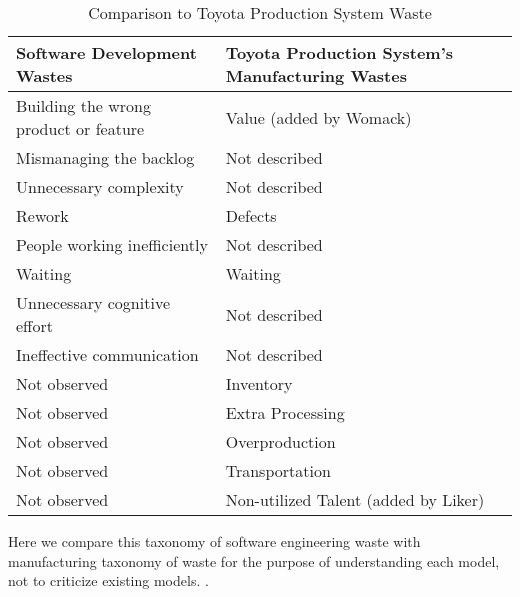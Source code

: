 \begin{table}[h]
\renewcommand{\arraystretch}{1.5}
\centering
\caption{Comparison to Toyota Production System Waste}
\label{ToyotaComparison}
\begin{tabular}{|p{1.57in}|p{1.57in}|}
\hline
Software Development Wastes           & Toyota Production System's Manufacturing Wastes \\ \hline
Building the wrong product or feature & Value (added by Womack)                         \\ \hline
Mismanaging the backlog               & Not described                                   \\ \hline
Unnecessary complexity                & Not described                                   \\ \hline
Rework                                & Defects                                         \\ \hline
People working inefficiently          & Not described                                   \\ \hline
Waiting                               & Waiting                                         \\ \hline
Unnecessary cognitive effort          & Not described                                   \\ \hline
Ineffective communication             & Not described                                   \\ \hline
Not observed                          & Inventory                                       \\ \hline
Not observed                          & Extra Processing                                \\ \hline
Not observed                          & Overproduction                                  \\ \hline
Not observed                          & Transportation                                  \\ \hline
Not observed                          & Non-utilized Talent (added by Liker)           \\ \hline
\end{tabular}
\end{table}

Here we compare this taxonomy of software engineering waste with manufacturing taxonomy of waste for the purpose of understanding each model, not to criticize existing models.   \cite{GlaserTheoreticalSensitivity}. 

